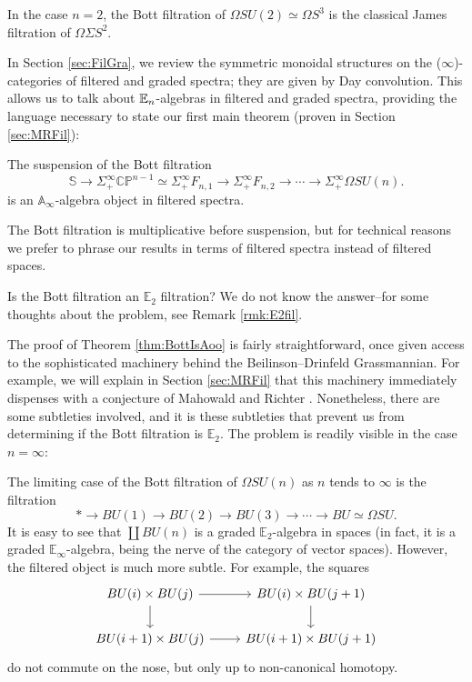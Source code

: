 \begin{exm}
In the case $n=2$, the Bott filtration of $\Omega SU(2) \simeq \Omega S^3$ is the classical James filtration of $\Omega \Sigma S^2$.
\end{exm}

In Section \ref{sec:FilGra}, we review the symmetric monoidal structures on the ($\infty$)-categories of filtered and graded spectra; they are given by Day convolution.  This allows us to talk about $\operatorname{\mathbb{E}}_n$-algebras in filtered and graded spectra, providing the language necessary to state our first main theorem (proven in Section \ref{sec:MRFil}):

\begin{thm} \label{thm:BottIsAoo}
The suspension of the Bott filtration 
$$\mathbb{S} \longrightarrow \Sigma_+^{\infty} \mathbb{CP}^{n-1} \simeq \Sigma_+^{\infty} F_{n,1} \longrightarrow \Sigma_+^{\infty} F_{n,2} \longrightarrow \cdots \longrightarrow \Sigma^{\infty}_+ \Omega SU(n).$$
is an $\mathbb{A}_\infty$-algebra object in filtered spectra.
\end{thm}

\begin{rmk}
The Bott filtration is multiplicative before suspension, but for technical reasons we prefer to phrase our results in terms of filtered spectra instead of filtered spaces.
\end{rmk}

\begin{qst} \label{qst:BottE2}
Is the Bott filtration an $\mathbb{E}_2$ filtration?  We do not know the answer--for some thoughts about the problem, see Remark \ref{rmk:E2fil}.
\end{qst}

The proof of Theorem \ref{thm:BottIsAoo} is fairly straightforward, once given access to the sophisticated machinery behind the Beilinson--Drinfeld Grassmannian.  For example, we will explain in Section \ref{sec:MRFil} that this machinery immediately dispenses with a conjecture of Mahowald and Richter \cite{MahowaldRichter}.  Nonetheless, there are some subtleties involved, and it is these subtleties that prevent us from determining if the Bott filtration is $\mathbb{E}_2$.  The problem is readily visible in the case $n=\infty$:

\begin{exm}\label{exm:BottFil}
The limiting case of the Bott filtration of $\Omega SU(n)$ as $n$ tends to $\infty$ is the filtration
$$* \longrightarrow BU(1) \longrightarrow BU(2) \longrightarrow BU(3) \longrightarrow \cdots \longrightarrow BU \simeq \Omega SU.$$
It is easy to see that $\coprod BU(n)$ is a graded $\mathbb{E}_2$-algebra in spaces (in fact, it is a graded $\mathbb{E}_\infty$-algebra, being the nerve of the category of vector spaces).  However, the filtered object is much more subtle.  For example, the squares
$$
\begin{tikzcd}
BU(i) \times BU(j) \arrow{d} \arrow{r} & BU(i) \times BU(j+1) \arrow{d} \\
BU(i+1) \times BU(j) \arrow{r} & BU(i+1) \times BU(j+1)
\end{tikzcd}
$$
do not commute on the nose, but only up to non-canonical homotopy.
\end{exm}

